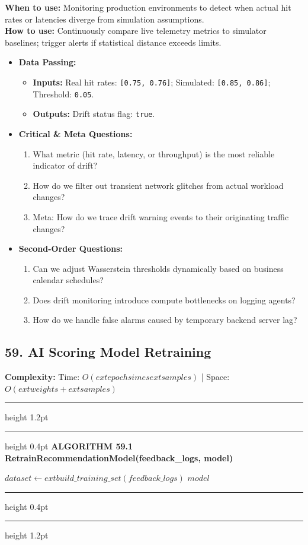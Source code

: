 \documentclass[11pt,a4paper]{article}
\newenvironment{textbookalgo}[2]{%
  \par\addvspace{1.2em}\noindent
  \hrule height 1.2pt
  \vspace{1.5pt}
  \hrule height 0.4pt
  \vspace{5pt}
  {\noindent\large\bfseries\sffamily ALGORITHM #1 \quad #2}
  \par\vspace{5pt}
  \RestyleAlgo{plain}
}{%
  \par\vspace{4pt}
  \hrule height 0.4pt
  \vspace{1.5pt}
  \hrule height 1.2pt
  \par\addvspace{1.2em}
}
\theoremstyle{definition}
\begin{document}
\noindent
\textbf{When to use:} Monitoring production environments to detect when actual hit rates or latencies diverge from simulation assumptions.\\
\textbf{How to use:} Continuously compare live telemetry metrics to simulator baselines; trigger alerts if statistical distance exceeds limits.
\begin{itemize}[leftmargin=*]
  \item[] \textbf{Data Passing:}
    \begin{itemize}
      \item \textbf{Inputs:} Real hit rates: \texttt{[0.75, 0.76]}; Simulated: \texttt{[0.85, 0.86]}; Threshold: \texttt{0.05}.
      \item \textbf{Outputs:} Drift status flag: \texttt{true}.
    \end{itemize}
  \item[] \textbf{Critical \& Meta Questions:}
  \begin{enumerate}
    \item What metric (hit rate, latency, or throughput) is the most reliable indicator of drift?
    \item How do we filter out transient network glitches from actual workload changes?
    \item Meta: How do we trace drift warning events to their originating traffic changes?
  \end{enumerate}
  \item[] \textbf{Second-Order Questions:}
  \begin{enumerate}
    \item Can we adjust Wasserstein thresholds dynamically based on business calendar schedules?
    \item Does drift monitoring introduce compute bottlenecks on logging agents?
    \item How do we handle false alarms caused by temporary backend server lag?
  \end{enumerate}
\end{itemize}
\medskip

\clearpage
\subsection{59. AI Scoring Model Retraining}


\noindent
\textbf{Complexity:} Time: $O(	ext{epochs} 	imes 	ext{samples})$ | Space: $O(	ext{weights} + 	ext{samples})$
\smallskip

\begin{textbookalgo}{59.1}{RetrainRecommendationModel(feedback\_logs, model)}
\begin{algorithm}[H]
$dataset \leftarrow 	ext{build\_training\_set}(feedback\_logs)$\;
\Return $model$\;
\end{algorithm}
\end{textbookalgo}
\end{document}
